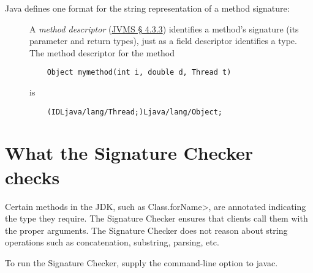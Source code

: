 Java defines one format for the string representation of a method signature:

\begin{description}

\item[]
  A \emph{method descriptor} (\href{https://docs.oracle.com/javase/specs/jvms/se8/html/jvms-4.html#jvms-4.3.3}{JVMS \S
    4.3.3}) identifies a method's signature (its parameter and return
  types), just as a field descriptor identifies a
  type.   The method descriptor for the method
\begin{Verbatim}
    Object mymethod(int i, double d, Thread t)
\end{Verbatim}
\noindent is
\begin{Verbatim}
    (IDLjava/lang/Thread;)Ljava/lang/Object;
\end{Verbatim}

\end{description}


\section{What the Signature Checker checks\label{signature-checks}}

Certain methods in the JDK, such as \<Class.forName>, are annotated
indicating the type they require.  The Signature Checker ensures that
clients call them with the proper arguments.  The Signature Checker does
not reason about string operations such as concatenation, substring,
parsing, etc.

\begin{sloppypar}
To run the Signature Checker, supply the
command-line option to javac.
\end{sloppypar}


